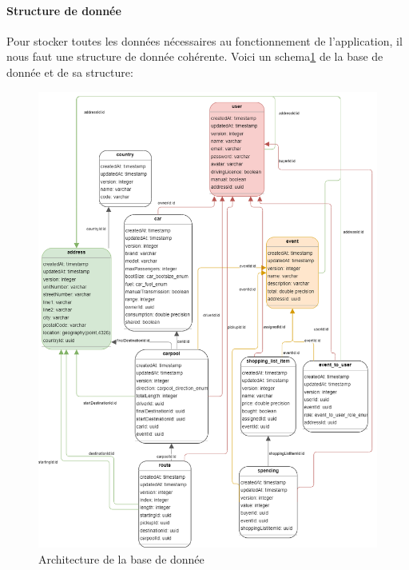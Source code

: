 \paragraph{Structure de donnée}
Pour stocker toutes les données nécessaires au fonctionnement de l'application, il nous faut une structure de donnée cohérente.
Voici un schema\ref{fig:dbSchema} de la base de donnée et de sa structure:
\begin{figure}[h!]
    \includegraphics[width=\linewidth]{./images/dbShema}\caption{Architecture de la base de donnée}\label{fig:dbSchema}
    \centering
\end{figure}